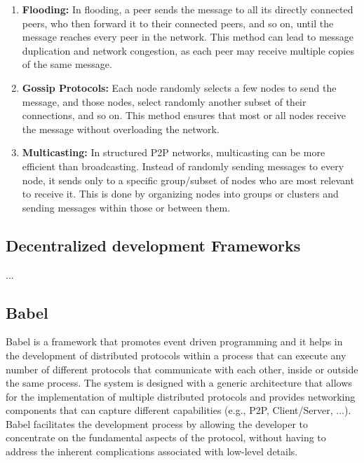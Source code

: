 \begin{enumerate}

  \item \textbf{Flooding:} In flooding, a peer sends the message to all its directly connected peers, who then forward it to their connected peers, and so on, until the message reaches every peer in the network. This method can lead to message duplication and network congestion, as each peer may receive multiple copies of the same message.
  \item \textbf{Gossip Protocols:} Each node randomly selects a few nodes to send the message, and those nodes, select randomly another subset of their connections, and so on. This method ensures that most or all nodes receive the message without overloading the network.
  \item \textbf{Multicasting:} In structured \gls{P2P} networks, multicasting can be more efficient than broadcasting. Instead of randomly sending messages to every node, it sends only to a specific group/subset of nodes who are most relevant to receive it. This is done by organizing nodes into groups or clusters and sending messages within those or between them.

\end{enumerate}



\subsection{Decentralized development Frameworks}
\label{sub:decentralized_development_frameworks}

...

\subsection{Babel}
\label{sub:babel}

Babel is a framework that promotes event driven programming and it helps in the development of distributed protocols within a process that can execute any number of different protocols that communicate with each other, inside or outside the same process. The system is designed with a generic architecture that allows for the implementation of multiple distributed protocols and provides networking components that can capture different capabilities (e.g., \gls{P2P}, Client/Server, ...). 
Babel facilitates the development process by allowing the developer to concentrate on the fundamental aspects of the protocol, without having to address the inherent complications associated with low-level details.

